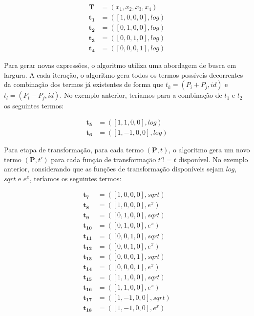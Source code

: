 \begin{equation}
  \begin{aligned}
    \mathbf{T} &= (x_1, x_2, x_3, x_4) \\
    \mathbf{t_1} &= ([1, 0, 0, 0], log) \\
    \mathbf{t_2} &= ([0, 1, 0, 0], log) \\
    \mathbf{t_3} &= ([0, 0, 1, 0], log) \\
    \mathbf{t_4} &= ([0, 0, 0, 1], log)
  \end{aligned}
\end{equation}

Para gerar novas expressões, o algoritmo utiliza uma abordagem de busca em largura. A cada iteração, o algoritmo gera todos os termos possíveis decorrentes da combinação dos termos já existentes de forma que $t_k = (P_i + P_j, id)$ e $t_l = (P_i - P_j, id)$. No exemplo anterior, teríamos para a combinação de $t_1$ e $t_2$ os seguintes termos:

\begin{equation}
  \begin{aligned}
    \mathbf{t_5} &= ([1, 1, 0, 0], log) \\
    \mathbf{t_6} &= ([1, -1, 0, 0], log)
  \end{aligned}
\end{equation}

Para etapa de transformação, para cada termo $(\mathbf{P}, t)$, o algoritmo gera um novo termo $(\mathbf{P}, t')$ para cada função de transformação $t' != t$ disponível. No exemplo anterior, considerando que as funções de transformação disponíveis sejam $log$,  $sqrt$ e $e^x$, teríamos os seguintes termos:

\begin{equation}
  \begin{aligned}
    \mathbf{t_7} &= ([1, 0, 0, 0], sqrt) \\
    \mathbf{t_8} &= ([1, 0, 0, 0], e^x) \\
    \mathbf{t_9} &= ([0, 1, 0, 0], sqrt) \\
    \mathbf{t_{10}} &= ([0, 1, 0, 0], e^x) \\
    \mathbf{t_{11}} &= ([0, 0, 1, 0], sqrt) \\
    \mathbf{t_{12}} &= ([0, 0, 1, 0], e^x) \\
    \mathbf{t_{13}} &= ([0, 0, 0, 1], sqrt) \\
    \mathbf{t_{14}} &= ([0, 0, 0, 1], e^x) \\
    \mathbf{t_{15}} &= ([1, 1, 0, 0], sqrt) \\
    \mathbf{t_{16}} &= ([1, 1, 0, 0], e^x) \\
    \mathbf{t_{17}} &= ([1, -1, 0, 0], sqrt) \\
    \mathbf{t_{18}} &= ([1, -1, 0, 0], e^x)
  \end{aligned}
\end{equation}

